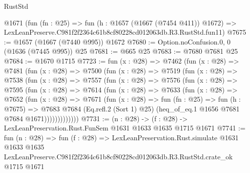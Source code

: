 \begin{lexlean}{RustStd}
\begin{coremodule}
    @1671
    (fun (fn : @25) =>
    fun (h : @1657 (@1667 (@7454 @411)) @1672) =>
    LexLeanPreserve.C981f2f2364c61b8cf80228cd012063db.R3.RustStd.fun11)
@7675 := @1657 (@1667 (@7440 @995)) @1672
@7680 := Option.noConfusion.{0, 0} (@1636 (@7445 @995)) @25
@7681 := @665 @25
@7683 := @7680 @7681 @25
@7684 := @1670 @1715
@7723 := fun (x : @28) =>
  @7462
    (fun (x : @28) =>
    @7481
      (fun (x : @28) =>
      @7500
        (fun (x : @28) =>
        @7519
          (fun (x : @28) =>
          @7538
            (fun (x : @28) =>
            @7557
              (fun (x : @28) =>
              @7576
                (fun (x : @28) =>
                @7595
                  (fun (x : @28) =>
                  @7614
                    (fun (x : @28) =>
                    @7633
                      (fun (x : @28) =>
                      @7652
                        (fun (x : @28) =>
                        @7671
                          (fun (x : @28) =>
                          fun (fn : @25) =>
                          fun (h : @7675) =>
                          @7683
                            @7684
                            (Eq.refl.{2} (Sort 1) @25)
                            (heq_of_eq.{1} @1656 @7681 @7684 @1671)))))))))))))
@7731 := (n : @28) -> (f : @28) -> LexLeanPreservation.Rust.FunSem @1631 @1633 @1635 @1715 @1671
@7741 := fun (n : @28) =>
  fun (f : @28) =>
  LexLeanPreservation.Rust.simulate
    @1631
    @1633
    @1635
    LexLeanPreserve.C981f2f2364c61b8cf80228cd012063db.R3.RustStd.crate_ok
    @1715
    @1671
\end{coremodule}
\end{lexlean}
